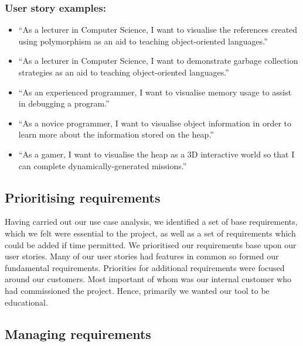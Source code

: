 \documentclass[10pt, a4paper]{article}
\begin{document}
\subsubsection{User story examples:}
\begin{itemize}
  \item “As a lecturer in Computer Science, I want to visualise the references created using polymorphism as an aid to teaching object-oriented languages.”
  \item “As a lecturer in Computer Science, I want to demonstrate garbage collection strategies as an aid to teaching object-oriented languages.”
  \item “As an experienced programmer, I want to visualise memory usage to assist in debugging a program.”
  \item “As a novice programmer, I want to visualise object information in order to learn more about the information stored on the heap.”
  \item “As a gamer, I want to visualise the heap as a 3D interactive world so that I can complete dynamically-generated missions.”
\end{itemize}


\subsection{Prioritising requirements}

Having carried out our use case analysis, we identified a set of base requirements, which we felt were essential to the project, as well as a set of requirements which could be added if time permitted. We prioritised our requirements base upon our user stories. Many of our user stories had features in common so formed our fundamental requirements. Priorities for additional requirements were focused around our customers. Most important of whom was our internal customer who had commissioned the project. Hence, primarily we wanted our tool to be educational.

\subsection{Managing requirements}
\end{document}
